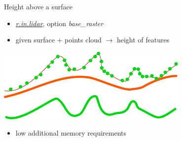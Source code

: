 \documentclass[xcolor={dvipsnames,usenames},beamer,aspectratio=169]{beamer}
\newcommand{\gmodule}[1]{\href{http://grass.osgeo.org/grass71/manuals/#1.html}{\emph{#1}}}
\begin{document}
\begin{frame}{Height above a surface}

\begin{itemize}
  \item \gmodule{r.in.lidar}, option \textit{base\_raster}
  \item given surface $+$ points cloud
    $\longrightarrow$ height of features
\end{itemize}

\begin{center}
  \includegraphics[width=0.7\textwidth]{images/features/base_raster}
\end{center}

\begin{itemize}
  \item low additional memory requirements
\end{itemize}

\end{frame}
\end{document}
